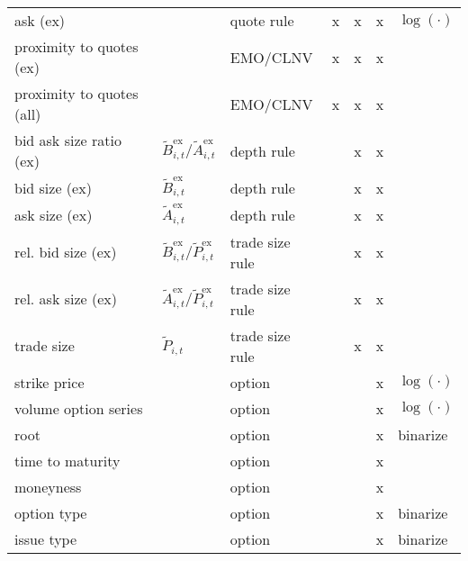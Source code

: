 \begin{tabular}{@{}lllllll@{}}
    ask (ex)                  &                                                             & quote rule           & x    & x    & x    & $\log(\cdot)$ \\
    proximity to quotes (ex)  &                                                             & \gls{EMO}/\gls{CLNV} & x    & x    & x    &               \\
    proximity to quotes (all) &                                                             & \gls{EMO}/\gls{CLNV} & x    & x    & x    &               \\
    bid ask size ratio (ex)   & $\tilde{B}_{i, t}^{\text{ex}}/\tilde{A}_{i, t}^{\text{ex}}$ & depth rule           &      & x    & x    &               \\
    bid size (ex)             & $\tilde{B}_{i, t}^{\text{ex}}$                              & depth rule           &      & x    & x    &               \\
    ask size (ex)             & $\tilde{A}_{i, t}^{\text{ex}}$                              & depth rule           &      & x    & x    &               \\
    rel. bid size (ex)        & $\tilde{B}_{i, t}^{\text{ex}}/\tilde{P}_{i, t}^{\text{ex}}$ & trade size rule      &      & x    & x    &               \\
    rel. ask size (ex)        & $\tilde{A}_{i, t}^{\text{ex}}/\tilde{P}_{i, t}^{\text{ex}}$ & trade size rule      &      & x    & x    &               \\
    trade size                & $\tilde{P}_{i, t}$                                          & trade size rule      &      & x    & x    &               \\
    strike price              &                                                             & option               &      &      & x    & $\log(\cdot)$ \\
    volume option series      &                                                             & option               &      &      & x    & $\log(\cdot)$ \\
    root                      &                                                             & option               &      &      & x    & binarize      \\
    time to maturity          &                                                             & option               &      &      & x    &               \\
    moneyness                 &                                                             & option               &      &      & x    &               \\
    option type               &                                                             & option               &      &      & x    & binarize      \\
    issue type                &                                                             & option               &      &      & x    & binarize      \\ \bottomrule
\end{tabular}
